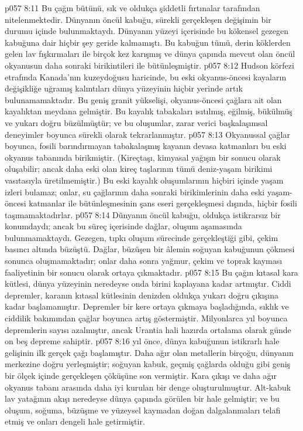 \vs p057 8:11 Bu çağın bütünü, sık ve oldukça şiddetli fırtınalar tarafından nitelenmektedir. Dünyanın öncül kabuğu, sürekli gerçekleşen değişimin bir durumu içinde bulunmaktaydı. Dünyanın yüzeyi içerisinde bu kökensel gezegen kabuğuna dair hiçbir şey geride kalmamıştı. Bu kabuğun tümü, derin köklerden gelen lav fışkırmaları ile birçok kez karışmış ve dünya çapında mevcut olan öncül okyanusun daha sonraki birikintileri ile bütünleşmiştir.
\vs p057 8:12 Hudson körfezi etrafında Kanada’nın kuzeydoğusu haricinde, bu eski okyanus\hyp{}öncesi kayaların değişikliğe uğramış kalıntıları dünya yüzeyinin hiçbir yerinde artık bulunamamaktadır. Bu geniş granit yükselişi, okyanus\hyp{}öncesi çağlara ait olan kayalıktan meydana gelmiştir. Bu kayalık tabakaları ısıtılmış, eğilmiş, bükülmüş ve yukarı doğru büzülmüştür; ve bu oluşumlar, zarar verici başkalaşımsal deneyimler boyunca sürekli olarak tekrarlanmıştır.
\vs p057 8:13 Okyanussal çağlar boyunca, fosili barındırmayan tabakalaşmış kayanın devasa katmanları bu eski okyanus tabanında birikmiştir. (Kireçtaşı, kimyasal yağışın bir sonucu olarak oluşabilir; ancak daha eski olan kireç taşlarının tümü deniz\hyp{}yaşam birikimi vasıtasıyla üretilmemiştir.) Bu eski kayalık oluşumlarının hiçbiri içinde yaşam izleri bulamaz; onlar, su çağlarının daha sonraki birikimlerinin daha eski yaşam\hyp{}öncesi katmanlar ile bütünleşmesinin şans eseri gerçekleşmesi dışında, hiçbir fosili taşımamaktadırlar.
\vs p057 8:14 Dünyanın öncül kabuğu, oldukça istikrarsız bir konumdaydı; ancak bu süreç içerisinde dağlar, oluşum aşamasında bulunmamaktaydı. Gezegen, tıpkı oluşum sürecinde gerçekleştiği gibi, çekim basıncı altında büzüştü. Dağlar, büzüşen bir âlemin soğuyan kabuğunun çökmesi sonunca oluşmamaktadır; onlar daha sonra yağmur, çekim ve toprak kayması faaliyetinin bir sonucu olarak ortaya çıkmaktadır.
\vs p057 8:15 Bu çağın kıtasal kara kütlesi, dünya yüzeyinin neredeyse onda birini kaplayana kadar artmıştır. Ciddi depremler, karanın kıtasal kütlesinin denizden oldukça yukarı doğru çıkışına kadar başlamamıştır. Depremler bir kere ortaya çıkmaya başladığında, sıklık ve ciddilik bakımından çağlar boyunca artış göstermiştir. Milyonlarca yıl boyunca depremlerin sayısı azalmıştır, ancak Urantia hali hazırda ortalama olarak günde on beş depreme sahiptir.
\vs p057 8:16  yıl önce, dünya kabuğunun istikrarlı hale gelişinin ilk gerçek çağı başlamıştır. Daha ağır olan metallerin birçoğu, dünyanın merkezine doğru yerleşmiştir; soğuyan kabuk, geçmiş çağlarda olduğu gibi geniş bir ölçek içinde gerçekleşen çöküşüne son vermiştir. Kara çıkışı ve daha ağır okyanus tabanı arasında daha iyi kurulan bir denge oluşturulmuştur. Alt\hyp{}kabuk lav yatağının akışı neredeyse dünya çapında görülen bir hale gelmiştir; ve bu oluşum, soğuma, büzüşme ve yüzeysel kaymadan doğan dalgalanmaları telafi etmiş ve onları dengeli hale getirmiştir.
